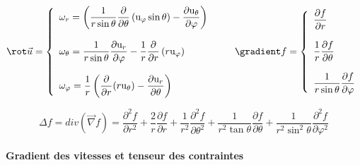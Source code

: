 $$ 
\rot \vec{u} =  \left\{ 
\begin{array}{l} 
\displaystyle \omega_r = \left(\frac{1}{r \sin \theta}\frac{\partial}{\partial \theta} \left( \mathrm{u}_\varphi \sin \theta \right) - \frac{\partial \mathrm{u}_\theta}{\partial \varphi}\right) \\ \\
\displaystyle \omega_\theta = \frac{1}{r \sin \theta} \frac{\partial \mathrm{u}_r}{\partial \varphi} - \frac{1}{r} \frac{\partial}{\partial r}\left( r  \mathrm{u}_\varphi \right) 
\\ \\
\displaystyle \omega_\varphi = \frac{1}{r}\left(\frac{\partial}{\partial r}(r \mathrm{u}_\theta) - \frac{\partial \mathrm{u}_r}{\partial \theta}\right)\\
\end{array}
\right.
\qquad 
\gradient f =  \left\{ 
\begin{array}{l} 
\displaystyle \frac{\partial f}{\partial r} 
 \\ \\
\displaystyle \frac{1}{r} \frac{\partial f}{\partial \theta} 
\\ \\
\displaystyle \frac{1}{r \sin \theta} \frac{\partial f}{\partial \varphi }\\
\end{array}
\right.
$$


$$\Delta f=div \left( \vec{\nabla} f \right)=\frac{\partial^2 f}{\partial r^2} + \frac{2}{r} \frac{\partial f}{\partial r} + \frac{1}{r^2} \frac{\partial^2 f}{\partial \theta^2} + \frac{1}{r^2 \tan \theta} \frac{\partial f}{\partial \theta} + \frac{1}{r^2 \sin^2 \theta} \frac{\partial^2 f}{\partial \varphi^2} $$



\paragraph{Gradient des vitesses et tenseur des contraintes}


